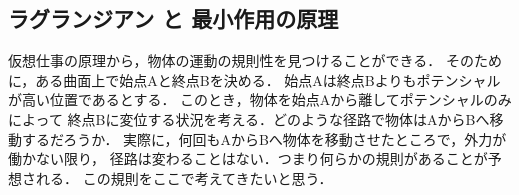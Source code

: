         \subsection{ラグランジアン と 最小作用の原理}
            \begin{mycomment}
            仮想仕事の原理から，物体の運動の規則性を見つけることができる．
            そのために，ある曲面上で始点Aと終点Bを決める．
            始点Aは終点Bよりもポテンシャルが高い位置であるとする．
            このとき，物体を始点Aから離してポテンシャルのみによって
            終点Bに変位する状況を考える．どのような径路で物体はAからBへ移動するだろうか．
            実際に，何回もAからBへ物体を移動させたところで，外力が働かない限り，
            径路は変わることはない．つまり何らかの規則があることが予想される．
            この規則をここで考えてきたいと思う．
            \end{mycomment}

